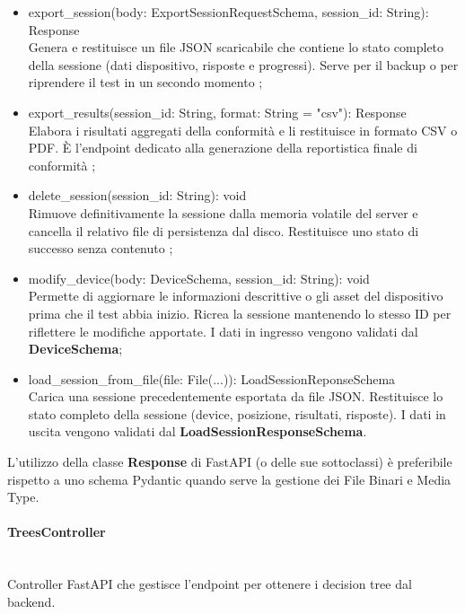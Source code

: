 \documentclass[a4paper,12pt]{article}
\begin{document}
\begin{itemize}
                        \item {\ttfamily export\_session(body: ExportSessionRequestSchema, session\_id: String): Response} \\ Genera e restituisce un file JSON scaricabile che contiene lo stato completo della sessione (dati dispositivo, risposte e progressi). Serve per il backup o per riprendere il test in un secondo momento ; 
                        \item {\ttfamily export\_results(session\_id: String, format: String = "csv"): Response} \\ Elabora i risultati aggregati della conformità e li restituisce in formato CSV o PDF. È l'endpoint dedicato alla generazione della reportistica finale di conformità ; 
                        \item {\ttfamily delete\_session(session\_id: String): void} \\ Rimuove definitivamente la sessione dalla memoria volatile del server e cancella il relativo file di persistenza dal disco. Restituisce uno stato di successo senza contenuto ;
                        \item {\ttfamily modify\_device(body: DeviceSchema, session\_id: String):  void} \\ Permette di aggiornare le informazioni descrittive o gli asset del dispositivo prima che il test abbia inizio. Ricrea la sessione mantenendo lo stesso ID per riflettere le modifiche apportate. I dati in ingresso vengono validati dal \textbf{DeviceSchema};
                        \item {\ttfamily load\_session\_from\_file(file: File(...)):  LoadSessionReponseSchema} \\ Carica una sessione precedentemente esportata da file JSON. Restituisce lo stato completo della sessione (device, posizione, risultati, risposte). I dati in uscita vengono validati dal \textbf{LoadSessionResponseSchema}.
                    \end{itemize}

                    L'utilizzo della classe \textbf{Response} di FastAPI (o delle sue sottoclassi) è preferibile rispetto a uno schema Pydantic quando  serve la gestione dei File Binari e Media Type. 
                    
                \paragraph{TreesController}\mbox{}\\
                    Controller FastAPI che gestisce l'endpoint per ottenere i decision tree dal backend.
\end{document}
